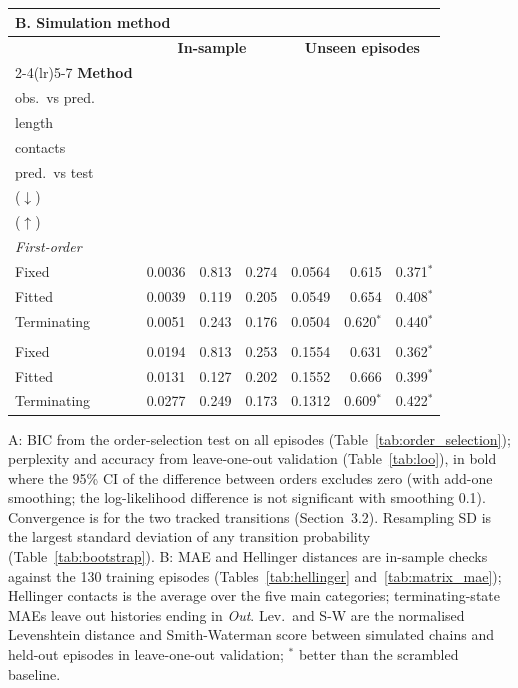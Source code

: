 \begin{table}[htbp]
\setlength{\tabcolsep}{3pt}
\begin{tabular*}{\linewidth}{@{\extracolsep{\fill}}lrrrrrr}
\toprule
\multicolumn{7}{l}{\textbf{B. Simulation method}} \\
\midrule
 & \multicolumn{3}{c}{\textbf{In-sample}} & \multicolumn{3}{c}{\textbf{Unseen episodes}} \\
\cmidrule(lr){2-4}\cmidrule(lr){5-7}
\textbf{Method} & \shortstack{\textbf{MAE}\\obs.\ vs pred.} & \shortstack{\textbf{Hellinger}\\length} & \shortstack{\textbf{Hellinger}\\contacts} & \shortstack{\textbf{MAE}\\pred.\ vs test} & \shortstack{\textbf{Lev.}\\($\downarrow$)} & \shortstack{\textbf{S-W}\\($\uparrow$)} \\
\midrule
\multicolumn{7}{l}{\textit{First-order}} \\
\quad Fixed & 0.0036 & 0.813 & 0.274 & 0.0564 & 0.615 & 0.371$^*$ \\
\quad Fitted & 0.0039 & 0.119 & 0.205 & 0.0549 & 0.654 & 0.408$^*$ \\
\quad Terminating & 0.0051 & 0.243 & 0.176 & 0.0504 & 0.620$^*$ & 0.440$^*$ \\
\addlinespace
\multicolumn{7}{l}{\textit{Second-order}} \\
\quad Fixed & 0.0194 & 0.813 & 0.253 & 0.1554 & 0.631 & 0.362$^*$ \\
\quad Fitted & 0.0131 & 0.127 & 0.202 & 0.1552 & 0.666 & 0.399$^*$ \\
\quad Terminating & 0.0277 & 0.249 & 0.173 & 0.1312 & 0.609$^*$ & 0.422$^*$ \\
\bottomrule
\end{tabular*}
\par\smallskip
\begin{minipage}{\linewidth}\footnotesize
A: BIC from the order-selection test on all episodes (Table~\ref{tab:order_selection}); perplexity and accuracy from leave-one-out validation (Table~\ref{tab:loo}), in bold where the 95\% CI of the difference between orders excludes zero (with add-one smoothing; the log-likelihood difference is not significant with smoothing 0.1). Convergence is for the two tracked transitions (Section~3.2). Resampling SD is the largest standard deviation of any transition probability (Table~\ref{tab:bootstrap}). B: MAE and Hellinger distances are in-sample checks against the 130 training episodes (Tables~\ref{tab:hellinger} and~\ref{tab:matrix_mae}); Hellinger contacts is the average over the five main categories; terminating-state MAEs leave out histories ending in \textit{Out}. Lev.\ and S-W are the normalised Levenshtein distance and Smith-Waterman score between simulated chains and held-out episodes in leave-one-out validation; $^*$ better than the scrambled baseline.
\end{minipage}
\end{table}
